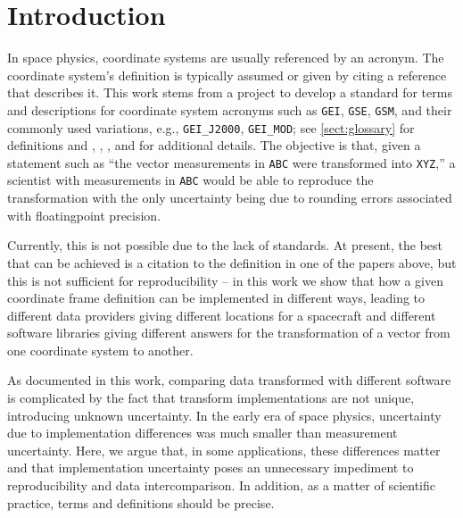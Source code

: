 \documentclass[draft]{agujournal2019}
\begin{document}



\section{Introduction}


In space physics, coordinate systems are usually referenced by an acronym. The coordinate system's definition is typically assumed or given by citing a reference that describes it. This work stems from a project to develop a standard for terms and descriptions for coordinate system acronyms such as \texttt{GEI}, \texttt{GSE}, \texttt{GSM}, and their commonly used variations, e.g., \texttt{GEI\_J2000}, \texttt{GEI\_MOD}; see \ref{sect:glossary} for definitions and , , , and  for additional details. The objective is that, given a statement such as ``the vector measurements in \texttt{ABC} were transformed into \texttt{XYZ},'' a scientist with measurements in \texttt{ABC} would be able to reproduce the transformation\add[a]{,} with the only uncertainty being due to rounding errors associated with floating\add[a]{-}point precision.

Currently, this is not possible due to the lack of standards. At present, the best that can be achieved is a citation to the definition in one of the papers above, but this is not sufficient for reproducibility -- in this work we show that how a given coordinate frame definition can be implemented in different ways, leading to different data providers giving different locations for a spacecraft and different software libraries giving different answers for  the transformation of a vector from one coordinate system to another.

As documented in this work, comparing data transformed with different software is complicated by the fact that transform implementations are not unique, introducing unknown uncertainty. In the early era of space physics, uncertainty due to implementation differences was much smaller than measurement uncertainty. Here, we argue that, in some applications, these differences matter and that implementation uncertainty poses an unnecessary impediment to reproducibility and data intercomparison. In addition, as a matter of scientific practice, terms and definitions should be precise.
\end{document}
